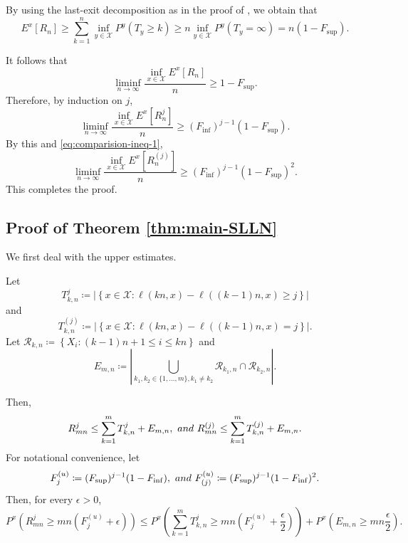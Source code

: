\documentclass[10pt,a4paper]{amsart}
\begin{document}
By using the last-exit decomposition as in the proof of  \cite[Theorem 1.2]{Okamura2014}, 
we obtain that
\begin{equation}\label{eq:exp-lower-most-basic} 
E^{x} \left[R_n \right] \ge \sum_{k=1}^{n} \inf_{y \in \mathcal{X}} P^y (T_y \ge k) \ge n \inf_{y \in \mathcal{X}} P^y (T_y = \infty) = n(1 - F_{\sup}). 
\end{equation}

It follows that 
\[ \liminf_{n \to \infty} \frac{\inf_{x \in \mathcal{X}} E^{x} \left[R_n \right]}{n} \ge 1 - F_{\sup}. \]
Therefore, by induction on $j$, 
\begin{equation*}\label{eq:lower-exp-1} 
\liminf_{n \to \infty} \frac{\inf_{x \in \mathcal{X}} E^{x} \left[R_n^j \right]}{n} \ge (F_{\inf})^{j-1} (1 - F_{\sup}). 
\end{equation*}
By this and \eqref{eq:comparision-ineq-1}, 
\[ \liminf_{n \to \infty} \frac{\inf_{x \in \mathcal{X}} E^{x} \left[R_n^{(j)} \right]}{n} \ge (F_{\inf})^{j-1} (1 - F_{\sup})^2. \]
This completes the proof. 

\subsection{Proof of Theorem \ref{thm:main-SLLN}}


We first deal with the upper estimates. 

Let 
\[ T^{j}_{k,n} \coloneqq \left|\left\{x \in \mathcal{X} \colon \ell(kn,x) - \ell((k-1)n,x) \ge  j \right\}\right|  \]
and 
\[ T^{(j)}_{k,n} \coloneqq \left|\left\{x \in \mathcal{X} \colon  \ell(kn,x) - \ell((k-1)n,x) =  j \right\}\right|.  \]
Let 
$\mathcal{R}_{k,n} \coloneqq \left\{X_{i} \colon (k-1)n + 1 \le i \le kn \right\}$  
and  
\begin{equation}\label{eq:Emn} 
E_{m,n} \coloneqq \left|\bigcup_{k_1, k_2 \in \{1, \dots, m\}, k_1 \ne k_2} \mathcal{R}_{k_1, n} \cap \mathcal{R}_{k_2, n} \right|. 
\end{equation}

Then, 
\[ R_{mn}^{j} \le \sum_{k=1}^{m}   T^{j}_{k,n} + E_{m,n}, \ \textup{ and }  \  R_{mn}^{(j)} \le \sum_{k=1}^{m}   T^{(j)}_{k,n} + E_{m,n}. \]
For notational convenience, let 
\[ F^{(u)}_{j} \coloneqq (F_{\sup})^{j-1} (1-F_{\inf}), \ \textup{ and }  \ F^{(u)}_{(j)} \coloneqq (F_{\sup})^{j-1} (1-F_{\inf})^2. \]
Then, for every $\epsilon > 0$, 
\[ P^x \left(R_{mn}^{j} \ge mn(F_j^{(u)} + \epsilon)\right) \le P^x \left(  \sum_{k=1}^{m}   T^{j}_{k,n} \ge mn \left(F_j^{(u)} + \frac{\epsilon}{2} \right) \right) + P^x \left( E_{m,n} \ge mn \frac{\epsilon}{2} \right). \]
\end{document}

